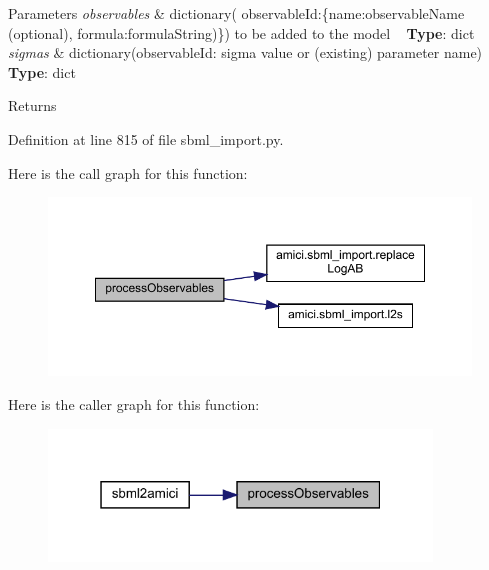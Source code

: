 \begin{DoxyParams}{Parameters}
{\em observables} & dictionary( observable\+Id\+:\{\textquotesingle{}name\textquotesingle{}\+:observable\+Name (optional), \textquotesingle{}formula\textquotesingle{}\+:formula\+String)\}) to be added to the model ~\newline
{\bfseries{Type}}\+: dict\\
\hline
{\em sigmas} & dictionary(observable\+Id\+: sigma value or (existing) parameter name) ~\newline
{\bfseries{Type}}\+: dict\\
\hline
\end{DoxyParams}
\begin{DoxyReturn}{Returns}

\end{DoxyReturn}


Definition at line 815 of file sbml\+\_\+import.\+py.

Here is the call graph for this function\+:
\nopagebreak
\begin{figure}[H]
\begin{center}
\leavevmode
\includegraphics[width=350pt]{classamici_1_1sbml__import_1_1_sbml_importer_a903b87aa6c483832424fa2cc76adc4d5_cgraph}
\end{center}
\end{figure}
Here is the caller graph for this function\+:
\nopagebreak
\begin{figure}[H]
\begin{center}
\leavevmode
\includegraphics[width=289pt]{classamici_1_1sbml__import_1_1_sbml_importer_a903b87aa6c483832424fa2cc76adc4d5_icgraph}
\end{center}
\end{figure}
\mbox{\label{classamici_1_1sbml__import_1_1_sbml_importer_a1579faf8b188de11ed58ddbebc3c20a7}} 
